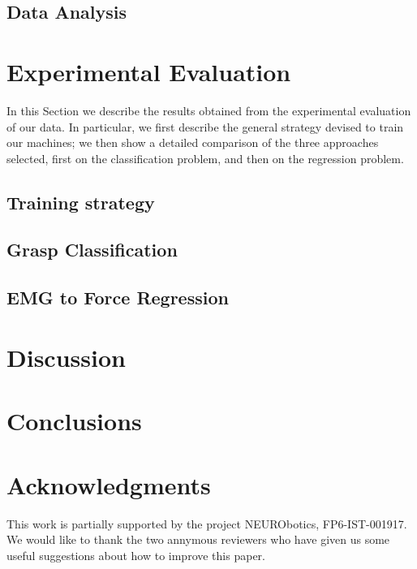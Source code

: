 \documentclass[conference,letterpaper]{IEEEtran}
\begin{document}
\subsection{Data Analysis}
\label{subsec:analysis}


\section{Experimental Evaluation}
\label{sec:exp}

In this Section we describe the results obtained from the experimental
evaluation of our data. In particular, we first describe the general
strategy devised to train our machines; we then show a detailed
comparison of the three approaches selected, first on the
classification problem, and then on the regression problem.

\subsection{Training strategy}
\label{subsec:strategy}


\subsection{Grasp Classification}
\label{subsec:classification}


\subsection{EMG to Force Regression}
\label{subsec:regression}


\section{Discussion}
\label{sec:discussion}


\section{Conclusions}
\label{sec:conclusions}



\section*{Acknowledgments}

This work is partially supported by the project NEURObotics,
FP6-IST-001917. We would like to thank the two annymous reviewers who
have given us some useful suggestions about how to improve this
paper.
\end{document}
